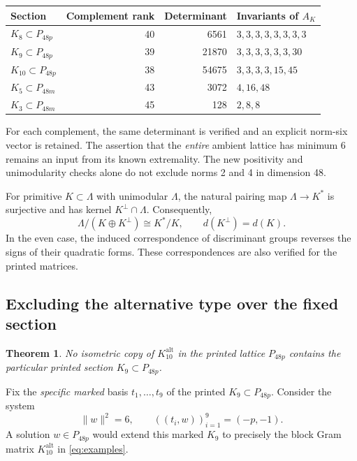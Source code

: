 \documentclass[11pt,a4paper]{article}
\newtheorem{theorem}{Theorem}[section]
\theoremstyle{remark}\newtheorem{remark}[theorem]{Remark}
\newcommand{\Kalt}{K_{10}^{\mathrm{alt}}}
\begin{document}
\begin{center}
\begin{tabular}{lrrl}
\toprule
Section &Complement rank&Determinant&Invariants of $A_K$\\\midrule
$K_8\subset P_{48p}$&40&6561&$3,3,3,3,3,3,3,3$\\
$K_9\subset P_{48p}$&39&21870&$3,3,3,3,3,3,30$\\
$K_{10}\subset P_{48p}$&38&54675&$3,3,3,3,15,45$\\
$K_5\subset P_{48m}$&43&3072&$4,16,48$\\
$K_3\subset P_{48m}$&45&128&$2,8,8$\\
\bottomrule
\end{tabular}
\end{center}

For each complement, the same determinant is verified and an explicit norm-six vector is retained. The assertion that the \emph{entire} ambient lattice has minimum 6 remains an input from its known extremality. The new positivity and unimodularity checks alone do not exclude norms 2 and 4 in dimension 48.

For primitive $K\subset\Lambda$ with unimodular $\Lambda$, the natural pairing map $\Lambda\to K^*$ is surjective and has kernel $K^\perp\cap\Lambda$. Consequently,
\[
\Lambda/(K\oplus K^\perp)\cong K^*/K,\qquad
d(K^\perp)=d(K).
\]
In the even case, the induced correspondence of discriminant groups reverses the signs of their quadratic forms. These correspondences are also verified for the printed matrices.

\subsection{Excluding the alternative type over the fixed section}

\begin{theorem}\label{thm:nonembedding}
No isometric copy of $\Kalt$ in the printed lattice $P_{48p}$ contains the particular printed section $K_9\subset P_{48p}$.
\end{theorem}

Fix the \emph{specific marked} basis $t_1,\ldots,t_9$ of the printed $K_9\subset P_{48p}$. Consider the system
\begin{equation}\label{eq:marked}
\|w\|^2=6,\qquad ((t_i,w))_{i=1}^9=(-p,-1).
\end{equation}
A solution $w\in P_{48p}$ would extend this marked $K_9$ to precisely the block Gram matrix $\Kalt$ in \eqref{eq:examples}.
\end{document}
